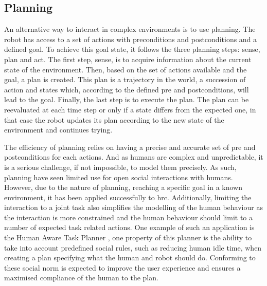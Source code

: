 \subsection{Planning} \label{ssec:planning}
    
    An alternative way to interact in complex environments is to use planning. The robot has access to a set of actions with preconditions and postconditions and a defined goal. To achieve this goal state, it follows the three planning steps: sense, plan and act. The first step, sense, is to acquire information about the current state of the environment. Then, based on the set of actions available and the goal, a plan is created. This plan is a trajectory in the world, a succession of action and states which, according to the defined pre and postconditions, will lead to the goal. Finally, the last step is to execute the plan. The plan can be reevaluated at each time step or only if a state differs from the expected one, in that case the robot updates its plan according to the new state of the environment and continues trying.
    
    
    The efficiency of planning relies on having a precise and accurate set of pre and postconditions for each actions. And as humans are complex and unpredictable, it is a serious challenge, if not impossible, to model them precisely. As such, planning have seen limited use for open social interactions with humans. However, due to the nature of planning, reaching a specific goal in a known environment, it has been applied successfully to \gls{hrc}. Additionally, limiting the interaction to a joint task also simplifies the modelling of the human behaviour as the interaction is more constrained and the human behaviour should limit to a number of expected task related actions. One example of such an application is the Human Aware Task Planner \citep{alili2009task}, one property of this planner is the ability to take into account predefined social rules, such as reducing human idle time, when creating a plan specifying what the human and robot should do. Conforming to these social norm is expected to improve the user experience and ensures a maximised compliance of the human to the plan.
    
